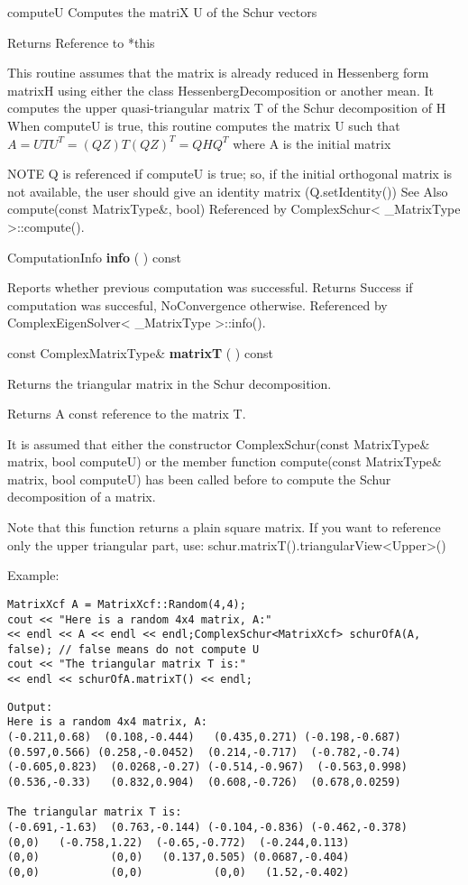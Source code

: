 computeU Computes the matriX U of the Schur vectors  

Returns Reference to *this 

This routine assumes that the matrix is already reduced in Hessenberg form matrixH using either the class HessenbergDecomposition or another mean. It computes the upper quasi-triangular matrix T of the Schur decomposition of H When computeU is true, this routine computes the matrix U such that $A = U T U^T = (QZ) T (QZ)^T = Q H Q^T$ where A is the initial matrix

NOTE Q is referenced if computeU is true; so, if the initial orthogonal matrix is not available, the user should give an identity matrix (Q.setIdentity())
See Also
compute(const MatrixType\&, bool) 
Referenced by ComplexSchur< \_MatrixType >::compute().


\vspace{0.3cm}
ComputationInfo \textbf{info}  ( )  const 

Reports whether previous computation was successful. 
Returns
Success if computation was succesful, NoConvergence otherwise. 
Referenced by ComplexEigenSolver< \_MatrixType >::info().


\vspace{0.3cm}
const ComplexMatrixType\& \textbf{matrixT}  ( )  const 

Returns the triangular matrix in the Schur decomposition. 

Returns A const reference to the matrix T.

It is assumed that either the constructor ComplexSchur(const MatrixType\& matrix, bool computeU) or the member function compute(const MatrixType\& matrix, bool computeU) has been called before to compute the Schur decomposition of a matrix.

Note that this function returns a plain square matrix. If you want to reference only the upper triangular part, use: 
schur.matrixT().triangularView<Upper>() 


Example:
\begin{lstlisting}
MatrixXcf A = MatrixXcf::Random(4,4);
cout << "Here is a random 4x4 matrix, A:" 
<< endl << A << endl << endl;ComplexSchur<MatrixXcf> schurOfA(A, false); // false means do not compute U
cout << "The triangular matrix T is:" 
<< endl << schurOfA.matrixT() << endl;
\end{lstlisting}

\begin{verbatim}
Output:
Here is a random 4x4 matrix, A:
(-0.211,0.68)  (0.108,-0.444)   (0.435,0.271) (-0.198,-0.687)
(0.597,0.566) (0.258,-0.0452)  (0.214,-0.717)  (-0.782,-0.74)
(-0.605,0.823)  (0.0268,-0.27) (-0.514,-0.967)  (-0.563,0.998)
(0.536,-0.33)   (0.832,0.904)  (0.608,-0.726)  (0.678,0.0259)

The triangular matrix T is:
(-0.691,-1.63)  (0.763,-0.144) (-0.104,-0.836) (-0.462,-0.378)
(0,0)   (-0.758,1.22)  (-0.65,-0.772)  (-0.244,0.113)
(0,0)           (0,0)   (0.137,0.505) (0.0687,-0.404)
(0,0)           (0,0)           (0,0)   (1.52,-0.402)
\end{verbatim}


